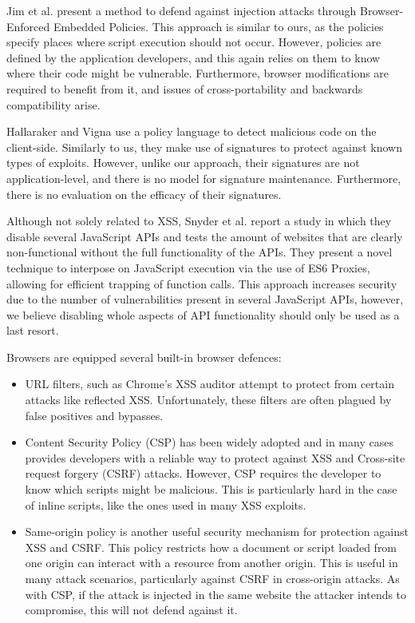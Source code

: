  Jim et al. \cite{Jim:2007:DSI:1242572.1242654} present a method to defend against injection attacks through Browser-Enforced Embedded Policies. This approach is similar to ours, as the policies specify places where script execution should not occur. However, policies are defined by the application developers, and this again relies on them to know where their code might be vulnerable. Furthermore, browser modifications are required to benefit from it, and issues of cross-portability and backwards compatibility arise.
 
 Hallaraker and Vigna \cite{Hallaraker:2005:DMJ:1078029.1078861} use a policy language to detect malicious code on the client-side. Similarly to us, they make use of signatures to protect against known types of exploits. However, unlike our approach, their signatures are not application-level, and there is no model for signature maintenance. Furthermore, there is no evaluation on the efficacy of their signatures. 

Although not solely related to XSS, Snyder et al. \cite{Snyder:2017:MWD:3133956.3133966} report a study in which they disable several JavaScript APIs and tests the amount of websites that are clearly non-functional without the full functionality of the APIs. They present a novel technique to interpose on JavaScript execution via the use of ES6 Proxies, allowing for efficient trapping of function calls. This approach increases security due to the number of vulnerabilities present in several JavaScript APIs, however, we believe disabling whole aspects of API functionality should only be used as a last resort.

Browsers are equipped several built-in browser defences:
\begin{itemize}
	\item  URL filters, such as Chrome's XSS auditor attempt to protect from certain attacks like reflected XSS. Unfortunately, these filters are often plagued by false positives and bypasses.
	\item Content Security Policy (CSP) has been widely adopted and in many cases provides developers with a reliable way to protect against XSS and Cross-site request forgery (CSRF) attacks. However, CSP requires the developer to know which scripts might be malicious. This is particularly hard in the case of inline scripts, like the ones used in many XSS exploits.
	\item Same-origin policy is another useful security mechanism for protection against XSS and CSRF. This policy restricts how a document or script loaded from one origin can interact with a resource from another origin. This is useful in many attack scenarios, particularly against CSRF in cross-origin attacks. As with CSP, if the attack is injected in the same website the attacker intends to compromise, this will not defend against it.
\end{itemize}

